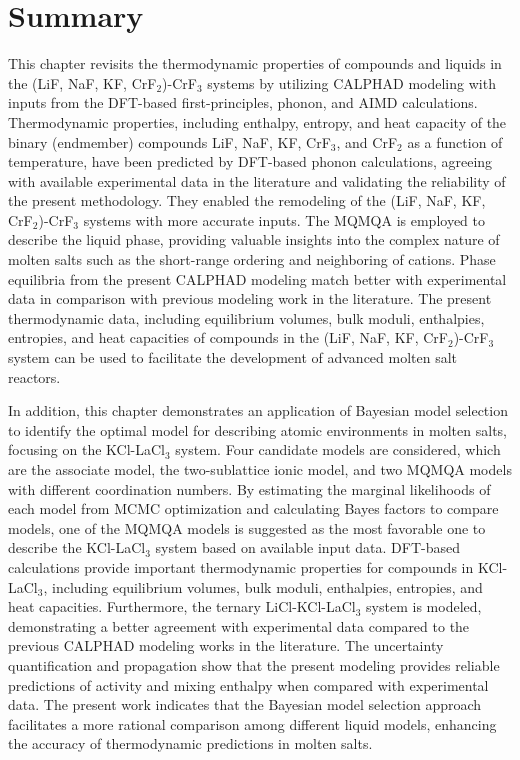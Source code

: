 \section{Summary} \label{moltensalts:sec:Summary}
This chapter revisits the thermodynamic properties of compounds and liquids in the (LiF, NaF, KF, CrF$_2$)-CrF$_3$ systems by utilizing CALPHAD modeling with inputs from the DFT-based first-principles, phonon, and AIMD calculations. Thermodynamic properties, including enthalpy, entropy, and heat capacity of the binary (endmember) compounds LiF, NaF, KF, CrF$_3$, and CrF$_2$ as a function of temperature, have been predicted by DFT-based phonon calculations, agreeing with available experimental data in the literature and validating the reliability of the present methodology. They enabled the remodeling of the (LiF, NaF, KF, CrF$_2$)-CrF$_3$ systems with more accurate inputs. The MQMQA is employed to describe the liquid phase, providing valuable insights into the complex nature of molten salts such as the short-range ordering and neighboring of cations. Phase equilibria from the present CALPHAD modeling match better with experimental data in comparison with previous modeling work in the literature. The present thermodynamic data, including equilibrium volumes, bulk moduli, enthalpies, entropies, and heat capacities of compounds in the (LiF, NaF, KF, CrF$_2$)-CrF$_3$ system can be used to facilitate the development of advanced molten salt reactors.

In addition, this chapter demonstrates an application of Bayesian model selection to identify the optimal model for describing atomic environments in molten salts, focusing on the KCl-LaCl$_3$ system. Four candidate models are considered, which are the associate model, the two-sublattice ionic model, and two MQMQA models with different coordination numbers. By estimating the marginal likelihoods of each model from MCMC optimization and calculating Bayes factors to compare models, one of the MQMQA models is suggested as the most favorable one to describe the KCl-LaCl$_3$ system based on available input data. DFT-based calculations provide important thermodynamic properties for compounds in KCl-LaCl$_3$, including equilibrium volumes, bulk moduli, enthalpies, entropies, and heat capacities. Furthermore, the ternary LiCl-KCl-LaCl$_3$ system is modeled, demonstrating a better agreement with experimental data compared to the previous CALPHAD modeling works in the literature. The uncertainty quantification and propagation show that the present modeling provides reliable predictions of activity and mixing enthalpy when compared with experimental data. The present work indicates that the Bayesian model selection approach facilitates a more rational comparison among different liquid models, enhancing the accuracy of thermodynamic predictions in molten salts.